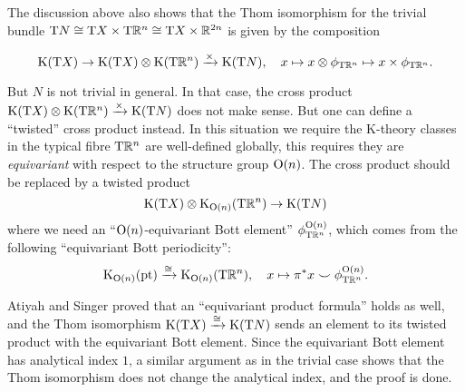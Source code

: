 \documentclass[reqno]{scrartcl}
\theoremstyle{definition}
\theoremstyle{remark}
\renewcommand{\cup}{\smile}
\begin{document}
The discussion above also shows that the Thom isomorphism for the trivial bundle $\mathrm{T}N\cong \mathrm{T}X\times \mathrm{T}\mathbb{R}^n\cong \mathrm{T}X\times\mathbb{R}^{2n}$ is given by the composition

\[ \operatorname{K}(\mathrm{T}X)\to\operatorname{K}(\mathrm{T}X)\otimes\operatorname{K}(\mathrm{T}\mathbb{R}^n)\xrightarrow{\times}\operatorname{K}(\mathrm{T}N),\quad x\mapsto x\otimes \phi_{\mathrm{T}\mathbb{R}^n}\mapsto x\times\phi_{\mathrm{T}\mathbb{R}^n}. \]

But $N$ is not trivial in general. In that case, the cross product $\operatorname{K}(\mathrm{T}X)\otimes\operatorname{K}(\mathrm{T}\mathbb{R}^n)\xrightarrow{\times}\operatorname{K}(\mathrm{T}N)$ does not make sense. But one can define a ``twisted'' cross product instead. In this situation we require the K-theory classes in the typical fibre $\mathrm{T}\mathbb{R}^n$ are well-defined globally, this requires they are \emph{equivariant} with respect to the structure group $\operatorname{O}(n)$. The cross product should be replaced by a twisted product
\[ \operatorname{K}(\mathrm{T}X)\otimes\operatorname{K}_{\operatorname{O}(n)}(\mathrm{T}\mathbb{R}^n)\to\operatorname{K}(\mathrm{T}N) \]
where we need an ``$\operatorname{O}(n)$-equivariant Bott element'' $\phi_{\mathrm{T}\mathbb{R}^n}^{\operatorname{O}(n)}$, which comes from the following ``equivariant Bott periodicity'':
\[ \K_{\O(n)}(\pt)\xrightarrow{\cong}\K_{\O(n)}(\mathrm{T}\R^{n}),\quad x\mapsto\pi^*x\cup\phi_{\mathrm{T}\R^n}^{\O(n)}. \] 

Atiyah and Singer proved that an ``equivariant product formula'' holds as well, and the Thom isomorphism $\operatorname{K}(\mathrm{T}X)\xrightarrow{\cong}\operatorname{K}(\mathrm{T}N)$ sends an element to its twisted product with the equivariant Bott element. Since the equivariant Bott element has analytical index $1$, a similar argument as in the trivial case shows that the Thom isomorphism does not change the analytical index, and the proof is done.




%
%
\end{document}

